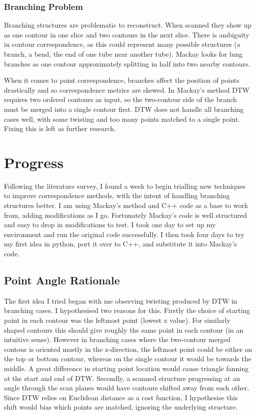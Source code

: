 \documentclass[10pt]{article}
\begin{document}
\subsubsection{Branching Problem}

Branching structures are problematic to reconstruct. When scanned they show up as one contour in one slice and two contours in the next slice. There is ambiguity in contour correspondence, as this could represent many possible structures (a branch, a bend, the end of one tube near another tube). Mackay \cite{robust2019construction} looks for lung branches as one contour approximately splitting in half into two nearby contours.

When it comes to point correspondence, branches affect the position of points drastically and so correspondence metrics are skewed. In Mackay's \cite{mackay2019robust} method DTW requires two ordered contours as input, so the two-contour side of the branch must be merged into a single contour first. DTW does not handle all branching cases well, with some twisting and too many points matched to a single point. Fixing this is left as further research.

\section{Progress}

Following the literature survey, I found a week to begin trialling new techniques to improve correspondence methods, with the intent of handling branching structures better. I am using Mackay's method and C++ code as a base to work from, adding modifications as I go. Fortunately Mackay's code is well structured and easy to drop in modifications to test. I took one day to set up my environment and run the original code successfully. I then took four days to try my first idea in python, port it over to C++, and substitute it into Mackay's code.

\subsection{Point Angle Rationale}

The first idea I tried began with me observing twisting produced by DTW in branching cases. I hypothesised two reasons for this. Firstly the choice of starting point in each contour was the leftmost point (lowest x value). For similarly shaped contours this should give roughly the same point in each contour (in an intuitive sense). However in branching cases where the two-contour merged contour is oriented mostly in the z-direction, the leftmost point could be either on the top or bottom contour, whereas on the single contour it would be towards the middle. A great difference in starting point location would cause triangle fanning at the start and end of DTW. Secondly, a scanned structure progressing at an angle through the scan planes would have contours shifted away from each other. Since DTW relies on Euclidean distance as a cost function, I hypothesise this shift would bias which points are matched, ignoring the underlying structure.
\end{document}
